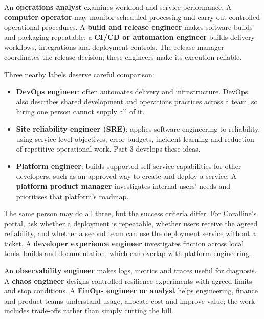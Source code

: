 An \textbf{operations analyst} examines workload and service performance. A \textbf{computer operator} may monitor scheduled processing and carry out controlled operational procedures. A \textbf{build and release engineer} makes software builds and packaging repeatable; a \textbf{CI/CD or automation engineer} builds delivery workflows, integrations and deployment controls. The release manager coordinates the release decision; these engineers make its execution reliable.


Three nearby labels deserve careful comparison:


\begin{itemize}[leftmargin=*]
\item \textbf{DevOps engineer}: often automates delivery and infrastructure. DevOps also describes shared development and operations practices across a team, so hiring one person cannot supply all of it. \autocite{dora-capabilities-roles}
\item \textbf{Site reliability engineer (SRE)}: applies software engineering to reliability, using service level objectives, error budgets, incident learning and reduction of repetitive operational work. Part 3 develops these ideas. \autocite{google-sre}
\item \textbf{Platform engineer}: builds supported self-service capabilities for other developers, such as an approved way to create and deploy a service. A \textbf{platform product manager} investigates internal users' needs and prioritises that platform's roadmap. \autocite{cncf-platform-roles}
\end{itemize}

The same person may do all three, but the success criteria differ. For Coralline's portal, ask whether a deployment is repeatable, whether users receive the agreed reliability, and whether a second team can use the deployment service without a ticket. A \textbf{developer experience engineer} investigates friction across local tools, builds and documentation, which can overlap with platform engineering.


An \textbf{observability engineer} makes logs, metrics and traces useful for diagnosis. A \textbf{chaos engineer} designs controlled resilience experiments with agreed limits and stop conditions. A \textbf{FinOps engineer or analyst} helps engineering, finance and product teams understand usage, allocate cost and improve value; the work includes trade-offs rather than simply cutting the bill. \autocite{finops-framework-roles}


